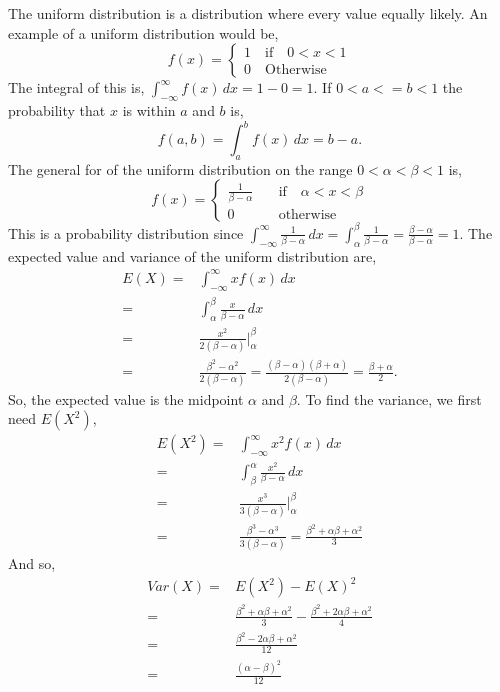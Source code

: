 \documentclass{article}
\begin{document}
The uniform distribution is a distribution where every value equally likely. An example of a uniform distribution would be,
\begin{equation}
    f(x) =
    \begin{cases}
        1 \quad \text{if} \quad 0 < x < 1 \\
        0 \quad \text{Otherwise}
    \end{cases}
\end{equation}
The integral of this is, $\int_{-\infty}^{\infty} f(x) \, dx = 1 - 0 = 1$. If $0 < a <= b < 1$ the probability that $x$ is within $a$ and $b$ is,
\begin{equation*}
    f(a, b) = \int_{a}^{b} f(x) \, dx = b - a.
\end{equation*}
The general for of the uniform distribution on the range $0 < \alpha < \beta < 1$ is,
\begin{equation}
    f(x) =
    \begin{cases}
        \frac{1}{\beta - \alpha} \quad & \text{if} \quad \alpha < x < \beta \\
        0 \quad & \text{otherwise}
    \end{cases}
\end{equation}
This is a probability distribution since $\int_{-\infty}^{\infty} \frac{1}{\beta - \alpha} \, dx = \int_{\alpha}^{\beta} \frac{1}{\beta - \alpha} = \frac{\beta - \alpha}{\beta - \alpha} = 1$. The expected value and variance of the uniform distribution are,
\begin{align*}
    E(X) = & \int_{-\infty}^{\infty} x f(x) \, dx \\
         = & \int_{\alpha}^{\beta} \frac{x}{\beta - \alpha} \, dx \\
         = & \frac{x^2}{2(\beta - \alpha)} \Bigr|^{\beta}_{\alpha} \\
         = & \frac{\beta^2 - \alpha^2}{2(\beta - \alpha)} = \frac{(\beta - \alpha)(\beta + \alpha)}{2(\beta - \alpha)} = \frac{\beta + \alpha}{2}.
\end{align*}
So, the expected value is the midpoint $\alpha$ and $\beta$. To find the variance, we first need $E(X^2)$,
\begin{align*}
    E(X^2) = & \int_{-\infty}^{\infty} x^2 f(x) \, dx \\
           = & \int_{\beta}^{\alpha} \frac{x^2}{\beta - \alpha} \, dx \\
           = & \frac{x^3}{3(\beta - \alpha)} \Bigr|^{\beta}_{\alpha} \\
           = & \frac{\beta^3 - \alpha^3}{3(\beta - \alpha)} = \frac{\beta^2 + \alpha \beta + \alpha^2}{3}
\end{align*}
And so,
\begin{align}
    Var(X) = & E(X^2) - E(X)^2 \\ 
           = & \frac{\beta^2 + \alpha \beta + \alpha^2}{3} - \frac{\beta^2 + 2\alpha \beta + \alpha^2}{4} \\
           = & \frac{\beta^2 - 2\alpha\beta + \alpha^2}{12} \\
           = & \frac{(\alpha - \beta)^2}{12}
\end{align}
\end{document}
